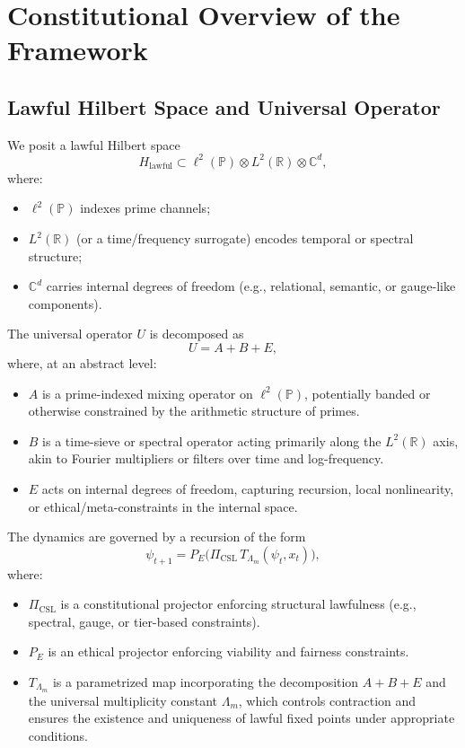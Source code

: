 \documentclass[11pt]{article}
\begin{document}
\section{Constitutional Overview of the Framework}

\subsection{Lawful Hilbert Space and Universal Operator}

We posit a lawful Hilbert space
\[
  H_{\text{lawful}} \subset \ell^2(\mathbb{P}) \otimes L^2(\mathbb{R}) \otimes \mathbb{C}^d,
\]
where:
\begin{itemize}[leftmargin=1.5em]
  \item \(\ell^2(\mathbb{P})\) indexes prime channels;
  \item \(L^2(\mathbb{R})\) (or a time/frequency surrogate) encodes temporal or
  spectral structure;
  \item \(\mathbb{C}^d\) carries internal degrees of freedom (e.g., relational,
  semantic, or gauge-like components).
\end{itemize}

The universal operator \(U\) is decomposed as
\[
  U = A + B + E,
\]
where, at an abstract level:
\begin{itemize}[leftmargin=1.5em]
  \item \(A\) is a prime-indexed mixing operator on \(\ell^2(\mathbb{P})\),
  potentially banded or otherwise constrained by the arithmetic structure of
  primes.
  \item \(B\) is a time-sieve or spectral operator acting primarily along the
  \(L^2(\mathbb{R})\) axis, akin to Fourier multipliers or filters over time
  and log-frequency.
  \item \(E\) acts on internal degrees of freedom, capturing recursion, local
  nonlinearity, or ethical/meta-constraints in the internal space.
\end{itemize}

The dynamics are governed by a recursion of the form
\begin{equation}
  \psi_{t+1}
  =
  P_E\bigl(
    \Pi_{\text{CSL}}\, T_{\Lambda_m}(\psi_t, x_t)
  \bigr),
  \label{eq:universal-recursion}
\end{equation}
where:
\begin{itemize}[leftmargin=1.5em]
  \item \(\Pi_{\text{CSL}}\) is a constitutional projector enforcing structural
  lawfulness (e.g., spectral, gauge, or tier-based constraints).
  \item \(P_E\) is an ethical projector enforcing viability and fairness
  constraints.
  \item \(T_{\Lambda_m}\) is a parametrized map incorporating the decomposition
  \(A+B+E\) and the universal multiplicity constant \(\Lambda_m\), which
  controls contraction and ensures the existence and uniqueness of lawful
  fixed points under appropriate conditions.
\end{itemize}
\end{document}
